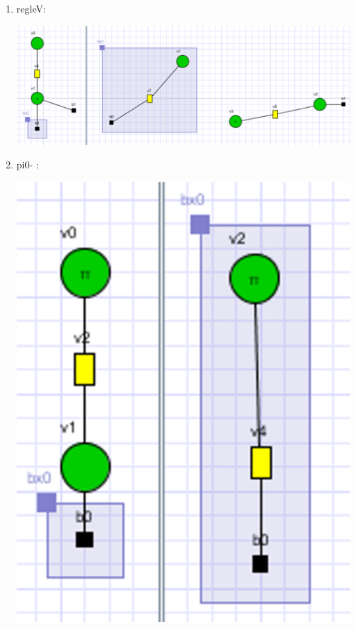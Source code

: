 \documentclass[a4paper,oneside]{book}
\begin{document}
\begin{enumerate}
\item regleV:
\begin{center}
\includegraphics[scale=0.5]{IMG/regleV.eps}
\end{center}

\item pi0- :
\begin{center}
\includegraphics[scale=0.5]{IMG/pi0.eps}
\end{center}


\end{enumerate}
\end{document}
